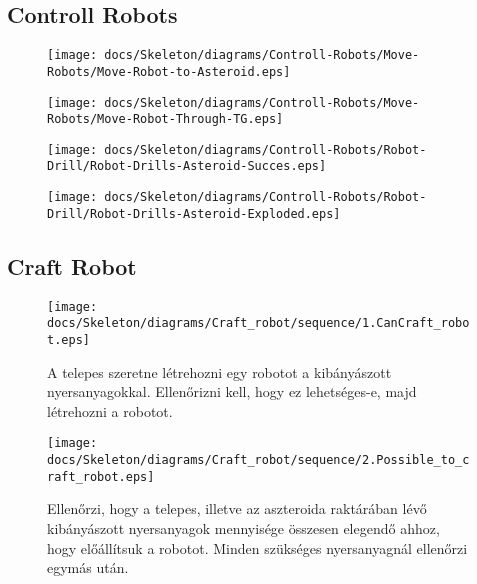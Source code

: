 
\subsection{Controll Robots}

\begin{figure}[H] 
    \centering 
    \texttt{[image: docs/Skeleton/diagrams/Controll-Robots/Move-Robots/Move-Robot-to-Asteroid.eps]} 
    \caption{} 
\end{figure} 

\begin{figure}[H] 
    \centering 
    \texttt{[image: docs/Skeleton/diagrams/Controll-Robots/Move-Robots/Move-Robot-Through-TG.eps]} 
    \caption{} 
\end{figure} 


\begin{figure}[H] 
    \centering 
    \texttt{[image: docs/Skeleton/diagrams/Controll-Robots/Robot-Drill/Robot-Drills-Asteroid-Succes.eps]} 
    \caption{} 
\end{figure} 

\begin{figure}[H] 
    \centering 
    \texttt{[image: docs/Skeleton/diagrams/Controll-Robots/Robot-Drill/Robot-Drills-Asteroid-Exploded.eps]} 
    \caption{} 
\end{figure} 

\subsection{Craft Robot}

\begin{figure}[H] 
    \centering 
    \texttt{[image: docs/Skeleton/diagrams/Craft\_robot/sequence/1.CanCraft\_robot.eps]} 
    \caption{A telepes szeretne létrehozni egy robotot a kibányászott nyersanyagokkal. Ellenőrizni kell, hogy ez lehetséges-e, majd létrehozni a robotot. } 
\end{figure} 

\begin{figure}[H] 
    \centering 
    \texttt{[image: docs/Skeleton/diagrams/Craft\_robot/sequence/2.Possible\_to\_craft\_robot.eps]} 
    \caption{Ellenőrzi, hogy a telepes, illetve az aszteroida raktárában lévő kibányászott nyersanyagok mennyisége összesen elegendő ahhoz, hogy előállítsuk a robotot. Minden szükséges nyersanyagnál ellenőrzi egymás után. } 
\end{figure} 

